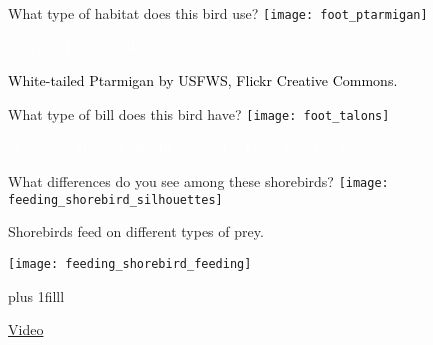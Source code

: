 \documentclass[t]{beamer}
\begin{document}
{
\begin{frame}[c,plain]{What type of habitat does this bird use?}
	\centering
	\texttt{[image: foot\_ptarmigan]}\par
\end{frame}
}

{
\begin{frame}[b,plain]
	\hfill\tiny\textcolor{white}{Arnstein Rønning, Wikimedia Commons.}
\end{frame}
}

{
\begin{frame}[b,plain]
	\tiny\textcolor{black}{White-tailed Ptarmigan by USFWS, Flickr Creative Commons.}
\end{frame}
}

{
\begin{frame}[c,plain]{What type of bill does this bird have?}
	\centering
	\texttt{[image: foot\_talons]}\par
\end{frame}
}

{
\begin{frame}[b,plain]
	\tiny\hfill\textcolor{white}{Osprey by Matt Shiffler Photography, Flickr Creative Commons.}
\end{frame}
}

{
\begin{frame}[t,plain]{What differences do you see among these shorebirds?}
	\centering
	\texttt{[image: feeding\_shorebird\_silhouettes]}\par
\end{frame}
}

{
\begin{frame}[t,plain]{Shorebirds feed on different types of prey.}
	\begin{center}
	\texttt{[image: feeding\_shorebird\_feeding]}\end{center}
\vskip0pt plus 1filll

\hfill\tiny\href{https://www.youtube.com/watch?v=56eU3KLIKZo}{Video}
\end{frame}
}


\end{document}
